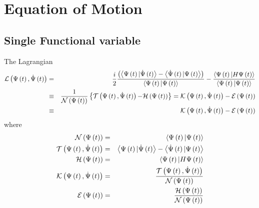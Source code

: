 \section{Equation of Motion}

\subsection{Single Functional variable}

The Lagrangian 
\begin{eqnarray}
{\cal L}\left( \Psi \left( t\right) ,\dot{\Psi}\left( t\right) \right)  &=&%
\frac{i}{2}\frac{\left( \left\langle \Psi \left( t\right) |\dot{\Psi}\left(
t\right) \right\rangle -\left\langle \dot{\Psi}\left( t\right) |\Psi \left(
t\right) \right\rangle \right) }{\left\langle \Psi \left( t\right) |\Psi
\left( t\right) \right\rangle }-\frac{\left\langle \Psi \left( t\right)
|H\Psi \left( t\right) \right\rangle }{\left\langle \Psi \left( t\right)
|\Psi \left( t\right) \right\rangle }  \nonumber \\
&\equiv &\frac{1}{{\cal N}\left( \Psi \left( t\right) \right) }\left\{ {\cal %
T}\left( \Psi \left( t\right) ,\dot{\Psi}\left( t\right) \right) {\cal -H}%
\left( \Psi \left( t\right) \right) \right\} ={\cal K}\left( \Psi \left(
t\right) ,\dot{\Psi}\left( t\right) \right) -{\cal E}\left( \Psi \left(
t\right) \right)   \nonumber \\
&\equiv &{\cal K}\left( \Psi \left( t\right) ,\dot{\Psi}\left( t\right)
\right) -{\cal E}\left( \Psi \left( t\right) \right)   \label{La}
\end{eqnarray}%
where 
\begin{eqnarray}
{\cal N}\left( \Psi \left( t\right) \right)  &=&\left\langle \Psi \left(
t\right) |\Psi \left( t\right) \right\rangle   \nonumber \\
{\cal T}\left( \Psi \left( t\right) ,\dot{\Psi}\left( t\right) \right) 
&=&\left\langle \Psi \left( t\right) |\dot{\Psi}\left( t\right)
\right\rangle -\left\langle \dot{\Psi}\left( t\right) |\Psi \left( t\right)
\right\rangle   \nonumber \\
{\cal H}\left( \Psi \left( t\right) \right)  &=&\left\langle \Psi \left(
t\right) |H\Psi \left( t\right) \right\rangle   \nonumber \\
{\cal K}\left( \Psi \left( t\right) ,\dot{\Psi}\left( t\right) \right)  &=&%
\frac{{\cal T}\left( \Psi \left( t\right) ,\dot{\Psi}\left( t\right) \right) 
}{{\cal N}\left( \Psi \left( t\right) \right) }  \nonumber \\
{\cal E}\left( \Psi \left( t\right) \right)  &=&\frac{{\cal H}\left( \Psi
\left( t\right) \right) }{{\cal N}\left( \Psi \left( t\right) \right) }
\end{eqnarray}%
